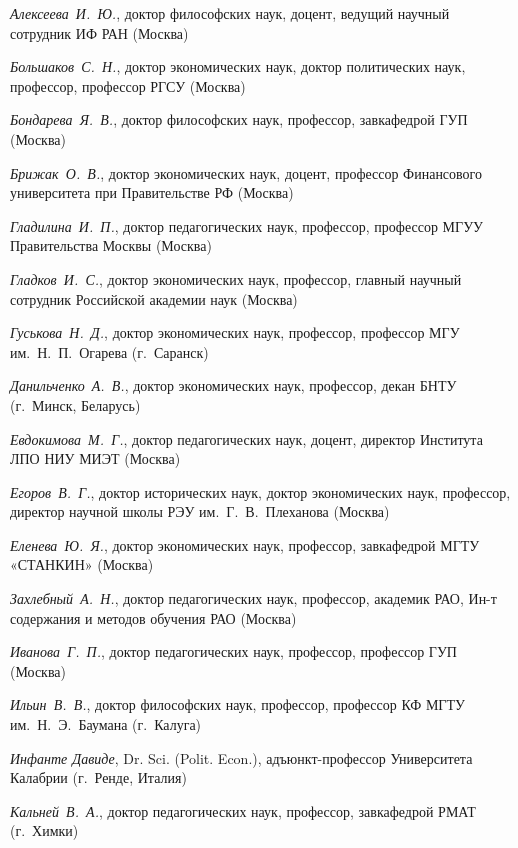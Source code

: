 \begin{multicols}{2}
\begin{flushleft}
    \noindent \textit{Алексеева И. Ю.}, доктор философских наук, доцент, ведущий научный сотрудник ИФ РАН (Москва)
    
    \noindent \textit{Большаков С. Н.}, доктор экономических наук, доктор политических наук, профессор, профессор РГСУ (Москва)
    
    \noindent \textit{Бондарева Я. В.}, доктор философских наук, профессор, завкафедрой ГУП (Москва)


    \noindent \textit{Брижак О. В.}, доктор экономических наук, доцент, профессор Финансового университета при Правительстве РФ (Москва)
    
    \noindent \textit{Гладилина И. П.}, доктор педагогических наук, профессор, профессор МГУУ Правительства Москвы (Москва)
    
    \noindent \textit{Гладков И. С.}, доктор экономических наук, профессор, главный научный сотрудник Российской академии наук (Москва)
    
    \noindent \textit{Гуськова Н. Д.}, доктор экономических наук, профессор, профессор МГУ им. Н. П. Огарева (г. Саранск)
    
    \noindent \textit{Данильченко А. В.}, доктор экономических наук, профессор, декан БНТУ (г. Минск, Беларусь)
    
    \noindent \textit{Евдокимова М. Г.}, доктор педагогических наук, доцент, директор Института ЛПО НИУ МИЭТ (Москва)
    
    \noindent \textit{Егоров В. Г.}, доктор исторических наук, доктор экономических наук, профессор, директор научной школы РЭУ им. Г. В. Плеханова (Москва)
   
    \noindent \textit{Еленева Ю. Я.}, доктор экономических наук, профессор, завкафедрой МГТУ «СТАНКИН» (Москва)
    
    \noindent \textit{Захлебный А. Н.}, доктор педагогических наук, профессор, академик РАО, Ин-т содержания и методов обучения РАО (Москва)
    
    \noindent \textit{Иванова Г. П.}, доктор педагогических наук, профессор, профессор ГУП (Москва)
    
    \noindent \textit{Ильин В. В.}, доктор философских наук, профессор, профессор КФ МГТУ им. Н. Э. Баумана (г. Калуга)
    
    \noindent \textit{Инфанте Давиде}, Dr. Sci. (Polit. Econ.), адъюнкт-профессор Университета Калабрии (г. Ренде, Италия)
    
    \noindent \textit{Кальней В. А.}, доктор педагогических наук, профессор, завкафедрой РМАТ (г. Химки)
    

\end{flushleft}
\end{multicols}
